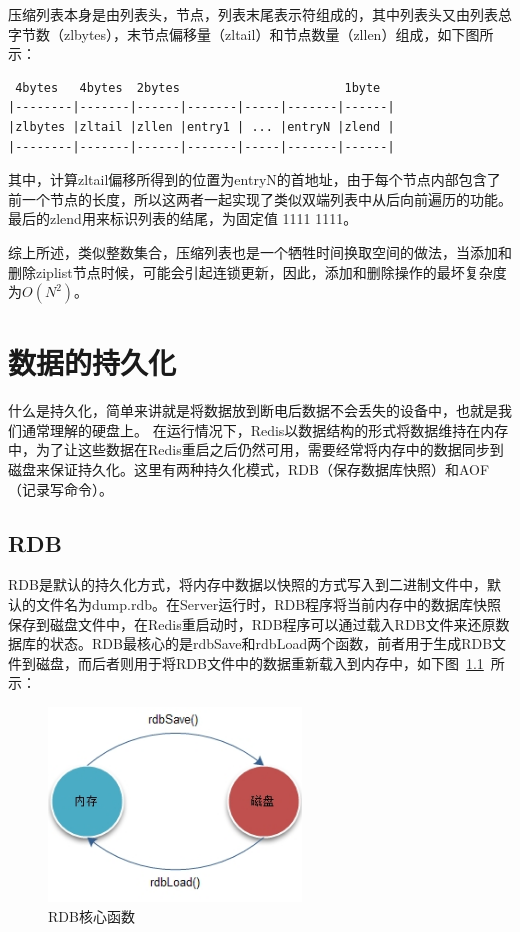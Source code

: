 \documentclass{zjutthesis}
\begin{document}
压缩列表本身是由列表头，节点，列表末尾表示符组成的，其中列表头又由列表总字节数（zlbytes），末节点偏移量（zltail）和节点数量（zllen）组成，如下图所示：
\begin{verbatim}
 4bytes   4bytes  2bytes                       1byte
|--------|-------|------|-------|-----|-------|------|
|zlbytes |zltail |zllen |entry1 | ... |entryN |zlend |
|--------|-------|------|-------|-----|-------|------|
\end{verbatim}
其中，计算zltail偏移所得到的位置为entryN的首地址，由于每个节点内部包含了前一个节点的长度，所以这两者一起实现了类似双端列表中从后向前遍历的功能。最后的zlend用来标识列表的结尾，为固定值 1111 1111。

综上所述，类似整数集合，压缩列表也是一个牺牲时间换取空间的做法，当添加和删除ziplist节点时候，可能会引起连锁更新，因此，添加和删除操作的最坏复杂度为$O(N^{2})$。


\chapter{数据的持久化}
什么是持久化，简单来讲就是将数据放到断电后数据不会丢失的设备中，也就是我们通常理解的硬盘上。
在运行情况下，Redis以数据结构的形式将数据维持在内存中，为了让这些数据在Redis重启之后仍然可用，需要经常将内存中的数据同步到磁盘来保证持久化。这里有两种持久化模式\cite{阮若夷2011redis下}，RDB（保存数据库快照）和AOF（记录写命令）。

\section{RDB}
RDB是默认的持久化方式，将内存中数据以快照的方式写入到二进制文件中，默认的文件名为dump.rdb。在Server运行时，RDB程序将当前内存中的数据库快照保存到磁盘文件中，在Redis重启动时，RDB程序可以通过载入RDB文件来还原数据库的状态。RDB最核心的是rdbSave和rdbLoad两个函数，前者用于生成RDB文件到磁盘，而后者则用于将RDB文件中的数据重新载入到内存中，如下图~\ref{fig:RDB}~所示：
\begin{figure}[H]
\centering
\includegraphics[width=0.6\textwidth]{RDB}
\caption{RDB核心函数}\label{fig:RDB}
\vspace{\baselineskip} %
\end{figure}
\end{document}

